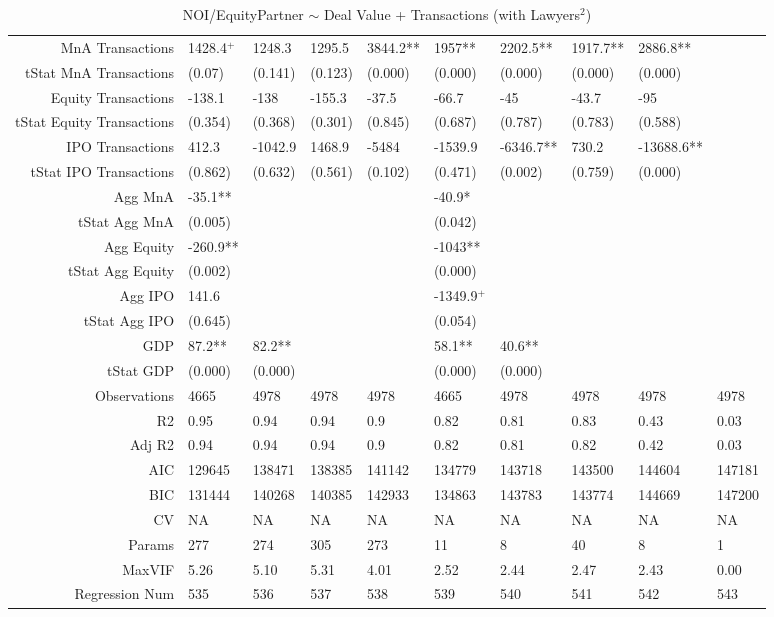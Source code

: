 \begin{table}[ht]
\begin{tabular}{rlllllllll}
  MnA Transactions & 1428.4$^{+}$ & 1248.3 & 1295.5 & 3844.2** & 1957** & 2202.5** & 1917.7** & 2886.8** &  \\ 
  tStat MnA Transactions & (0.07) & (0.141) & (0.123) & (0.000) & (0.000) & (0.000) & (0.000) & (0.000) &  \\ 
  Equity Transactions & -138.1 & -138 & -155.3 & -37.5 & -66.7 & -45 & -43.7 & -95 &  \\ 
  tStat Equity Transactions & (0.354) & (0.368) & (0.301) & (0.845) & (0.687) & (0.787) & (0.783) & (0.588) &  \\ 
  IPO Transactions & 412.3 & -1042.9 & 1468.9 & -5484 & -1539.9 & -6346.7** & 730.2 & -13688.6** &  \\ 
  tStat IPO Transactions & (0.862) & (0.632) & (0.561) & (0.102) & (0.471) & (0.002) & (0.759) & (0.000) &  \\ 
  Agg MnA & -35.1** &  &  &  & -40.9* &  &  &  &  \\ 
  tStat Agg MnA & (0.005) &  &  &  & (0.042) &  &  &  &  \\ 
  Agg Equity & -260.9** &  &  &  & -1043** &  &  &  &  \\ 
  tStat Agg Equity & (0.002) &  &  &  & (0.000) &  &  &  &  \\ 
  Agg IPO & 141.6 &  &  &  & -1349.9$^{+}$ &  &  &  &  \\ 
  tStat Agg IPO & (0.645) &  &  &  & (0.054) &  &  &  &  \\ 
  GDP & 87.2** & 82.2** &  &  & 58.1** & 40.6** &  &  &  \\ 
  tStat GDP & (0.000) & (0.000) &  &  & (0.000) & (0.000) &  &  &  \\ 
  Observations & 4665 & 4978 & 4978 & 4978 & 4665 & 4978 & 4978 & 4978 & 4978 \\ 
  R2 & 0.95 & 0.94 & 0.94 & 0.9 & 0.82 & 0.81 & 0.83 & 0.43 & 0.03 \\ 
  Adj R2 & 0.94 & 0.94 & 0.94 & 0.9 & 0.82 & 0.81 & 0.82 & 0.42 & 0.03 \\ 
  AIC & 129645 & 138471 & 138385 & 141142 & 134779 & 143718 & 143500 & 144604 & 147181 \\ 
  BIC & 131444 & 140268 & 140385 & 142933 & 134863 & 143783 & 143774 & 144669 & 147200 \\ 
  CV & NA & NA & NA & NA & NA & NA & NA & NA & NA \\ 
  Params & 277 & 274 & 305 & 273 & 11 & 8 & 40 & 8 & 1 \\ 
  MaxVIF & 5.26 & 5.10 & 5.31 & 4.01 & 2.52 & 2.44 & 2.47 & 2.43 & 0.00 \\ 
  Regression Num & 535 & 536 & 537 & 538 & 539 & 540 & 541 & 542 & 543 \\ 
   \hline
\end{tabular}
\caption{NOI/EquityPartner $\sim$ Deal Value + Transactions (with Lawyers$^2$)} 
\end{table}
